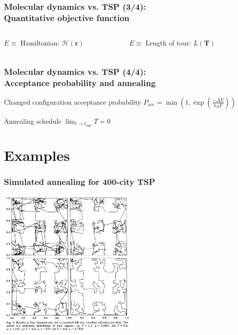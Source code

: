 \documentclass[aspectratio=43]{beamer}
\begin{document}
\begin{frame}
	\frametitle{Molecular dynamics vs. TSP (3/4):\\\alert{Quantitative objective function}}
	\begin{columns}[T]
		\begin{column}{0.5\textwidth}
			\begin{description}
				 \item<1-> $E \equiv$ Hamiltonian: $\mathcal{H}(\boldsymbol{r})$
			 \end{description}
		\end{column}		
		\begin{column}{0.5\textwidth}
			\begin{description}
				 \item<1-> $E \equiv$ Length of tour: $L(\boldsymbol{T})$
			 \end{description}
			\end{column}
	\end{columns}
\end{frame}

\begin{frame}
	\frametitle{Molecular dynamics vs. TSP (4/4):\\\alert{Acceptance probability and annealing}}
	\begin{center}
		\begin{description}
			\item<1-> Changed configuration acceptance probability \alert{$P_\text{acc} = \min(1, \exp(\frac{-\Delta E}{k_BT}))$}
			\item<2-> Annealing schedule \alert{$\lim_{t \rightarrow t_\text{end}} T = 0$}
		\end{description}
	\end{center}
\end{frame}



\section{Examples}

\begin{frame}
	\frametitle{Simulated annealing for 400-city TSP}
	\begin{center}
		\includegraphics[width=6.8cm]{tsp_400.png}\cite{Kirkpatrick}
	\end{center}
\end{frame}
\end{document}
